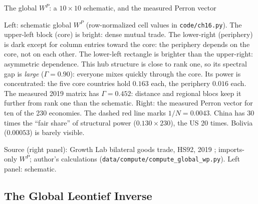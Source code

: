 \documentclass[../structural_economics_book.tex]{subfiles}
\begin{document}
\begin{vizpanel}{The global $W^P$: a $10 \times 10$ schematic, and the measured Perron vector}
\begin{center}
\qquad
{}
\end{center}
\vspace{-0.5em}
\small Left: schematic global $W^P$ (row-normalized cell values in \texttt{code/ch16.py}). The upper-left block (core) is bright: dense mutual trade. The lower-right (periphery) is dark except for column entries toward the core: the periphery depends on the core, not on each other. The lower-left rectangle is brighter than the upper-right: asymmetric dependence. This hub structure is close to rank one, so its spectral gap is \emph{large} ($\Gamma = 0.90$): everyone mixes quickly through the core. Its power is concentrated: the five core countries hold $0.163$ each, the periphery $0.016$ each. The measured 2019 matrix has $\Gamma = 0.452$: distance and regional blocs keep it further from rank one than the schematic. Right: the measured Perron vector for ten of the 230 economies. The dashed red line marks $1/N = 0.0043$. China has 30 times the ``fair share'' of structural power ($0.130 \times 230$), the US 20 times. Bolivia ($0.00053$) is barely visible.
\par\footnotesize Source (right panel): Growth Lab bilateral goods trade, HS92, 2019 \citep{growthlab2026atlas}; imports-only $W^P$; author's calculations (\texttt{data/compute/compute\_global\_wp.py}). Left panel: schematic.
\end{vizpanel}


\subsection{The Global Leontief Inverse}
\end{document}

